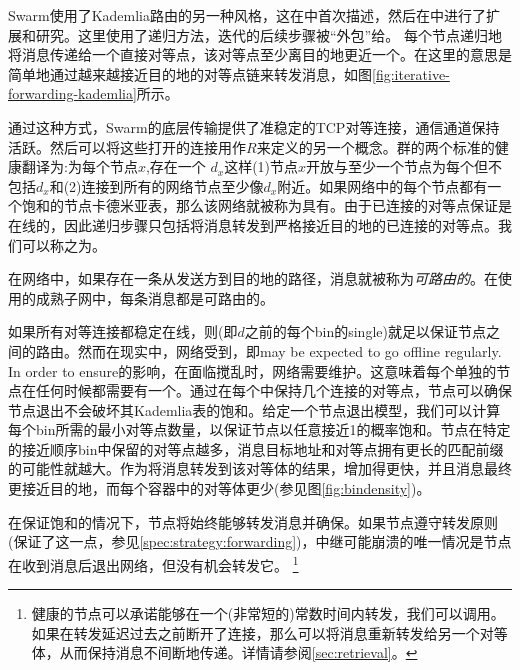 Swarm使用了Kademlia路由的另一种风格，这在\cite{heep2010r}中首次描述，然后在\cite{tronetal2019-network}中进行了扩展和研究。这里使用了递归方法，迭代的后续步骤被“外包”给。
每个节点递归地将消息传递给一个直接对等点，该对等点至少离目的地更近一个。在这里的意思是简单地通过越来越接近目的地的对等点链来转发消息，如图\ref{fig:iterative-forwarding-kademlia}所示。


通过这种方式，Swarm的底层传输提供了准稳定的TCP对等连接，通信通道保持活跃。然后可以将这些打开的连接用作$R$来定义的另一个概念。群的两个标准的健康翻译为:为每个节点$x$,存在一个 $d_x$这样(1)节点$x$开放与至少一个节点为每个但不包括$d_x$和(2)连接到所有的网络节点至少像$d_x$附近。如果网络中的每个节点都有一个饱和的节点卡德米亚表，那么该网络就被称为具有。由于已连接的对等点保证是在线的，因此递归步骤只包括将消息转发到严格接近目的地的已连接的对等点。我们可以称之为。


在网络中，如果存在一条从发送方到目的地的路径，消息就被称为\emph{可路由的}。在使用的成熟子网中，每条消息都是可路由的。 

如果所有对等连接都稳定在线，则(即$d$之前的每个bin的\a single)就足以保证节点之间的路由。然而在现实中，网络受到，即\nodes may be expected to go offline regularly. In order to ensure的影响，在面临搅乱时，网络需要维护。这意味着每个单独的节点在任何时候都需要有一个。通过在每个中保持几个连接的对等点，节点可以确保节点退出不会破坏其Kademlia表的饱和。给定一个节点退出模型，我们可以计算每个bin所需的最小对等点数量，以保证节点以任意接近1的概率饱和。节点在特定的接近顺序bin中保留的对等点越多，消息目标地址和对等点拥有更长的匹配前缀的可能性就越大。作为将消息转发到该对等体的结果，增加得更快，并且消息最终更接近目的地，而每个容器中的对等体更少(参见图\ref{fig:bindensity})。



在保证饱和的情况下，节点将始终能够转发消息并确保。如果节点遵守转发原则(保证了这一点，参见\ref{spec:strategy:forwarding})，中继可能崩溃的唯一情况是节点在收到消息后退出网络，但没有机会转发它。%
%
\footnote{健康的节点可以承诺能够在一个(非常短的)常数时间内转发，我们可以调用。如果在转发延迟过去之前断开了连接，那么可以将消息重新转发给另一个对等体，从而保持消息不间断地传递。详情请参阅\ref{sec:retrieval}。
} 

